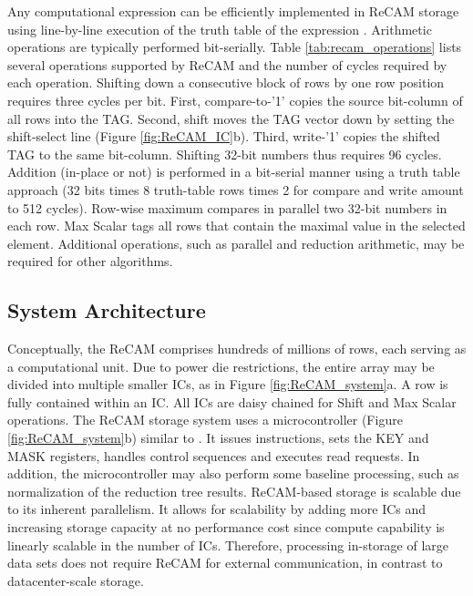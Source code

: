 \documentclass{superfri}
\begin{document}
	Any computational expression can be efficiently implemented in ReCAM storage using line-by-line execution of the truth table of the expression \cite{balasubramonian2014near}. Arithmetic operations are typically performed bit-serially. Table \ref{tab:recam_operations} lists several operations supported by ReCAM and the number of cycles required by each operation.  Shifting down a consecutive block of rows by one row position requires three cycles per bit. First, compare-to-'1' copies the source bit-column of all rows into the TAG. Second, shift moves the TAG vector down by setting the shift-select line (Figure \ref{fig:ReCAM_IC}b). Third, write-'1' copies the shifted TAG to the same bit-column. Shifting 32-bit numbers thus requires 96 cycles. Addition (in-place or not) is performed in a bit-serial manner using a truth table approach \cite{balasubramonian2014near} (32 bits times 8 truth-table rows times 2 for compare and write amount to 512 cycles). Row-wise maximum compares in parallel two 32-bit numbers in each row. Max Scalar tags all rows that contain the maximal value in the selected element. Additional operations, such as parallel and reduction arithmetic, may be required for other algorithms. 
	
	
	\subsection{System Architecture}
	\label{sec:system_architecture}
	Conceptually, the ReCAM comprises hundreds of millions of rows, each serving as a computational unit. Due to power die restrictions, the entire array may be divided into multiple smaller ICs, as in Figure \ref{fig:ReCAM_system}a. A row is fully contained within an IC. All ICs are daisy chained for Shift and Max Scalar operations.
	The ReCAM storage system uses a microcontroller (Figure \ref{fig:ReCAM_system}b) similar to \cite{guo2013ac}. It issues instructions, sets the KEY and MASK registers, handles control sequences and executes read requests. In addition, the microcontroller may also perform some baseline processing, such as normalization of the reduction tree results.
	ReCAM-based storage is scalable due to its inherent parallelism. It allows for scalability by adding more ICs and increasing storage capacity at no performance cost since compute capability is linearly scalable in the number of ICs. Therefore, processing in-storage of large data sets does not require ReCAM for external communication, in contrast to datacenter-scale storage. 
	
\end{document}
